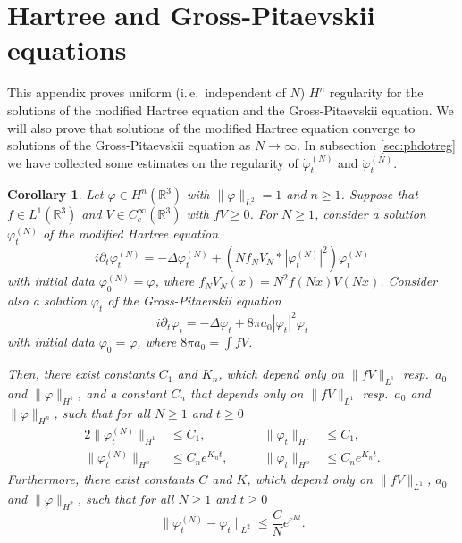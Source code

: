 \documentclass[11pt,a4paper,draft,DIV11]{scrartcl}	%
\newtheorem{cor}[thm]{Corollary}
\newcommand{\R}{\mathds{R}}
\newcommand{\ph}{\varphi_t^{(N)}}	%
\newcommand{\phdot}{\dot{\varphi}_t^{(N)}}	%
\newcommand{\phddot}{\ddot{\varphi}_t^{(N)}}	%
\begin{document}
\section{Hartree and Gross-Pitaevskii equations}
This appendix proves uniform (i.\,e.\ independent of $N$) $H^n$ regularity for the solutions of the modified Hartree equation and the Gross-Pitaevskii equation. We will also prove that solutions of the modified Hartree equation converge to solutions of the Gross-Pitaevskii equation as $N \to \infty$. In subsection \ref{sec:phdotreg} we have collected some estimates on the regularity of $\phdot$ and $\phddot$.

\begin{cor} \label{l:pdes}%
  Let $\varphi \in H^n(\R^3)$ with $\| \varphi \|_{L^2} = 1$ and $n \geq 1$. Suppose that
  $f \in L^1(\R^3)$ and $V \in C_c^\infty(\R^3)$ with $fV \ge 0$. For $N \ge
  1$, consider a solution $\ph$ of the modified Hartree equation
  \[
    i \partial_t \varphi_t^{(N)} = - \Delta \varphi_t^{(N)} + (N f_N V_N *
    |\varphi_t^{(N)}|^2) \varphi_t^{(N)}
  \]
  with initial data $\varphi^{(N)}_0 = \varphi$, where $f_N V_N(x) = N^2
  f(Nx)V(Nx)$. Consider also a solution $\varphi_t$ of the Gross-Pitaevskii equation
  \[
    i \partial_t \varphi_t = - \Delta \varphi_t + 8 \pi a_0 |\varphi_t|^2
    \varphi_t
  \]
  with initial data $\varphi_0 = \varphi$, where $8 \pi a_0 = \int f V$.

  Then,
%
 there exist constants $C_1$ and $K_n$, which depend only on $\| fV \|_{L^1}$ resp.\
  $a_0$ and $\| \varphi \|_{H^1}$, and a constant $C_n$ that depends only
  on $\| fV \|_{L^1}$ resp.\ $a_0$ and $\| \varphi \|_{H^n}$, such that
%
for all $N \ge 1$ and $t \ge 0$
  \begin{alignat}{2}
    \| \varphi_t^{(N)} \|_{H^1} & \le C_1, & \qquad \| \varphi_t \|_{H^1} &
    \le C_1, \tag{i} \label{H1} \\
    \| \varphi_t^{(N)} \|_{H^n} & \le C_n e^{K_n t}, & \qquad \| \varphi_t
    \|_{H^n} & \le C_n e^{K_n t}. \tag{ii}
  \end{alignat}
 Furthermore, there exist constants $C$ and $K$, which depend only on $\| fV \|_{L^1}$, $a_0$
  and $\| \varphi \|_{H^2}$, such that for all $N \geq 1$ and $t \geq 0$
  \begin{equation}
    \| \varphi_t^{(N)} - \varphi_t \|_{L^2} \le \frac{C}{N} e^{e^{K t}}.
    \tag{iii}
  \end{equation}
\end{cor}
\end{document}
